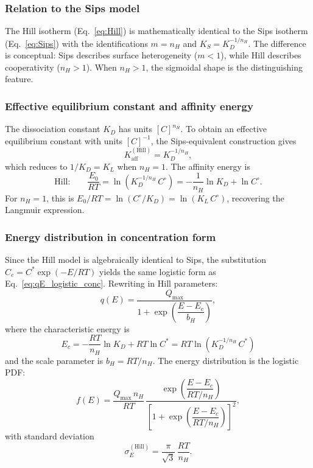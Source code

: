 	\subsubsection{Relation to the Sips model}

	The Hill isotherm (Eq.~\eqref{eq:Hill}) is mathematically
	identical to the Sips isotherm (Eq.~\eqref{eq:Sips}) with the
	identifications $m = n_H$ and $K_S = K_D^{-1/n_H}$.  The
	difference is conceptual: Sips describes surface heterogeneity
	($m < 1$), while Hill describes cooperativity ($n_H > 1$).
	When $n_H > 1$, the sigmoidal shape is the distinguishing
	feature.

	\subsubsection{Effective equilibrium constant and affinity energy}

	The dissociation constant $K_D$ has units $[C]^{n_H}$. To
	obtain an effective equilibrium constant with units $[C]^{-1}$,
	the Sips-equivalent construction gives
	\begin{equation}
		K_{\mathrm{aff}}^{\mathrm{(Hill)}}
		= K_D^{-1/n_H},
	\end{equation}
	which reduces to $1/K_D = K_L$ when $n_H = 1$.  The affinity
	energy is
	\begin{equation}
		\text{Hill:}\qquad
		\frac{E_0}{RT}
		= \ln(K_D^{-1/n_H}\,C^\circ)
		= -\frac{1}{n_H}\ln K_D + \ln C^\circ.
		\label{eq:E_Hill}
	\end{equation}
	For $n_H = 1$, this is $E_0/RT = \ln(C^\circ/K_D) = \ln(K_L\,C^\circ)$,
	recovering the Langmuir expression.

	\subsubsection{Energy distribution in concentration form}

	Since the Hill model is algebraically identical to Sips, the
	substitution $C_e = C^{\ast}\exp(-E/RT)$ yields the same
	logistic form as Eq.~\eqref{eq:qE_logistic_conc}.  Rewriting
	in Hill parameters:
	\begin{equation}
		q(E) = \frac{Q_{\max}}
		{1 + \exp\!\left(\dfrac{E - E_c}{b_H}\right)},
		\label{eq:qE_Hill}
	\end{equation}
	where the characteristic energy is
	\begin{equation}
		E_c = -\frac{RT}{n_H}\ln K_D
		+ RT\ln C^{\ast}
		= RT\ln(K_D^{-1/n_H}\,C^{\ast})
	\end{equation}
	and the scale parameter is $b_H = RT / n_H$.  The energy
	distribution is the logistic PDF:
	\begin{equation}
		f(E) = \frac{Q_{\max}\, n_H}{RT}\,
		\frac{\exp\!\left(\dfrac{E - E_c}{RT/n_H}\right)}
		{\left[1 + \exp\!\left(\dfrac{E - E_c}{RT/n_H}\right)
		\right]^{2}},
		\label{eq:fE_Hill}
	\end{equation}
	with standard deviation
	\begin{equation}
		\sigma_E^{\mathrm{(Hill)}}
		= \frac{\pi}{\sqrt{3}}\,\frac{RT}{n_H}.
		\label{eq:sigmaE_Hill}
	\end{equation}

